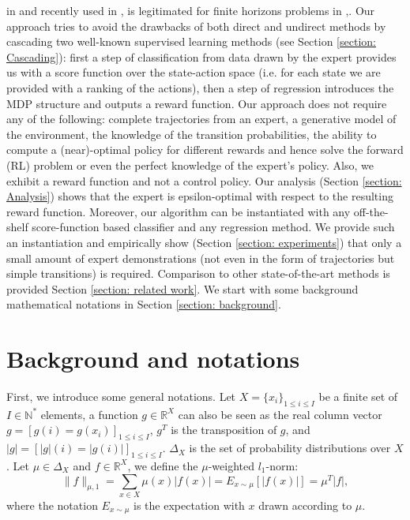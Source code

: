 \documentclass[11pt]{article}
\newcommand{\0}{\mathbf{0}}
\newcommand{\1}{\mathbf{1}}
\begin{document}
in \cite{zadrozny2003cost}
and recently used 
in \cite{melo2010learning}, is legitimated for finite horizons problems in \cite{syed2010reduction},\cite{ross2010efficient}.
Our approach tries to avoid the drawbacks of both direct and undirect methods by cascading two well-known supervised learning methods (see Section \ref{section: Cascading}): first a step of classification from data drawn by the expert provides us with a score function over the state-action space (i.e. for each state we are provided with a ranking of the actions), then a step of regression introduces the MDP structure and outputs a reward function.
Our approach does not require any of the following: complete trajectories from an expert, a generative model of the environment, the knowledge of the transition probabilities, the ability to compute a (near)-optimal policy for different rewards and hence solve the forward (RL) problem or even the perfect knowledge of the expert's policy. Also, we exhibit a reward function and not a control policy. Our analysis (Section \ref{section: Analysis}) shows that the expert is epsilon-optimal with respect to the resulting reward function. Moreover, our algorithm can be instantiated with any off-the-shelf score-function based classifier and any regression method. We provide such an instantiation and empirically show (Section \ref{section: experiments}) that only a small amount of expert demonstrations (not even in the form of trajectories but simple transitions) is required. Comparison to other state-of-the-art methods is provided Section \ref{section: related work}. We start with some background mathematical notations in Section \ref{section: background}.
\section{Background and notations}
\label{sec-2}

  \label{section: background}
First, we introduce some general notations. Let $X=\{x_i\}_{1\leq i \leq I}$ be a finite set of $I\in\mathbb{N}^*$ elements, a function $g\in\mathbb{R}^X$ can also be seen as the real column vector $g=[g(i)=g(x_i)]_{1\leq i \leq I}$, $g^T$ is the transposition of $g$, and $|g|=[|g|(i)=|g(i)|]_{1\leq i \leq I}$.
$\Delta_X$ is the set of probability distributions over $X$. Let $\mu\in\Delta_X$ and $f\in\mathbb{R}^X$, we define the $\mu$-weighted $l_1$-norm:
\begin{equation}
\|f\|_{\mu,1}=\sum_{x\in X}\mu(x)|f(x)|=E_{x\sim\mu}[|f(x)|]=\mu^T|f|,
\end{equation}
where the notation $E_{x\sim\mu}$ is the expectation with $x$ drawn according to $\mu$.
\end{document}
